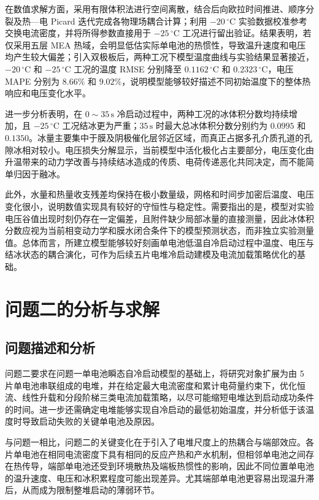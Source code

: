 \documentclass[bwprint]{gmcmthesis}
\numberwithin{figure}{section}
\begin{document}
在数值求解方面，采用有限体积法进行空间离散，结合后向欧拉时间推进、顺序分裂及热—电 Picard 迭代完成各物理场耦合计算；利用 \(-20\,^\circ\mathrm C\) 实验数据校准参考交换电流密度，并将所得参数直接用于 \(-25\,^\circ\mathrm C\) 工况进行留出验证。结果表明，若仅采用五层 MEA 热域，会明显低估实际单电池的热惯性，导致温升速度和电压均产生较大偏差；引入双极板后，两种工况下模型温度曲线与实验结果显著接近，\(-20\,^\circ\mathrm C\) 和 \(-25\,^\circ\mathrm C\) 工况的温度 RMSE 分别降至 \(0.1162\,^\circ\mathrm C\) 和 \(0.2323\,^\circ\mathrm C\)，电压 MAPE 分别为 \(8.66\%\) 和 \(9.02\%\)，说明模型能够较好描述不同初始温度下的整体热响应和电压变化水平。

进一步分析表明，在 \(0\sim35\,\mathrm s\) 冷启动过程中，两种工况的冰体积分数均持续增加，且 \(-25\,^\circ\mathrm C\) 工况结冰更为严重；\(35\,\mathrm s\) 时最大总冰体积分数分别约为 \(0.0995\) 和 \(0.1350\)。冰量主要集中于膜及阴极催化层邻近区域，而真正占据多孔介质孔道的孔隙冰相对较小。电压损失分解显示，当前模型中活化极化占主要部分，电压变化由升温带来的动力学改善与持续结冰造成的传质、电荷传递恶化共同决定，而不能简单归因于融冰。

此外，水量和热量收支残差均保持在极小数量级，网格和时间步加密后温度、电压变化很小，说明数值实现具有较好的守恒性与稳定性。需要指出的是，模型对实验电压谷值出现时刻仍存在一定偏差，且附件缺少局部冰量的直接测量，因此冰体积分数应视为当前相变动力学和膜水闭合条件下的模型预测状态，而非独立实验测量值。总体而言，所建立模型能够较好刻画单电池低温自冷启动过程中温度、电压与结冰状态的耦合演化，可作为后续五片电堆冷启动建模及电流加载策略优化的基础。

\section{问题二的分析与求解}
\subsection{问题描述和分析}
问题二要求在问题一单电池瞬态自冷启动模型的基础上，将研究对象扩展为由 5 片单电池串联组成的电堆，并在给定最大电流密度和累计电荷量约束下，优化恒流、线性升载和分段阶梯三类电流加载策略，以尽可能缩短电堆达到启动成功条件的时间。进一步还需确定电堆能够实现自冷启动的最低初始温度，并分析低于该温度时导致启动失败的关键单电池及原因。

与问题一相比，问题二的关键变化在于引入了电堆尺度上的热耦合与端部效应。各片单电池在相同电流密度下具有相同的反应产热和产水机制，但相邻单电池之间存在热传导，端部单电池还受到环境散热及端板热惯性的影响，因此不同位置单电池的温升速度、电压和冰积累程度可能出现差异。尤其端部单电池更容易出现温升滞后，从而成为限制整堆启动的薄弱环节。
\end{document}
